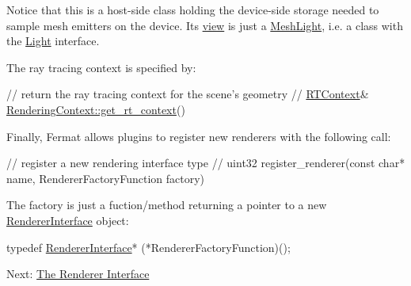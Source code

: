 \begin{DoxyParagraph}{}
Notice that this is a host-\/side class holding the device-\/side storage needed to sample mesh emitters on the device. Its \hyperlink{_fermat_host_device_page_FermatPlainViewsSection}{view} is just a \hyperlink{struct_mesh_light}{Mesh\+Light}, i.\+e. a class with the \hyperlink{struct_light}{Light} interface.
\end{DoxyParagraph}
\begin{DoxyParagraph}{}
The ray tracing context is specified by\+: ~\newline

\begin{DoxyCode}
\textcolor{comment}{// return the ray tracing context for the scene's geometry}
\textcolor{comment}{//}
\hyperlink{struct_r_t_context}{RTContext}& \hyperlink{struct_rendering_context_af12ae90cc453d139f6f8ae35791e6563}{RenderingContext::get\_rt\_context}()
\end{DoxyCode}

\end{DoxyParagraph}
\begin{DoxyParagraph}{}
Finally, Fermat allows plugins to register new renderers with the following call\+: ~\newline

\begin{DoxyCode}
\textcolor{comment}{// register a new rendering interface type}
\textcolor{comment}{//}
uint32 register\_renderer(\textcolor{keyword}{const} \textcolor{keywordtype}{char}* name, RendererFactoryFunction factory)
\end{DoxyCode}
 The factory is just a fuction/method returning a pointer to a new \hyperlink{struct_renderer_interface}{Renderer\+Interface} object\+: ~\newline

\begin{DoxyCode}
\textcolor{keyword}{typedef} \hyperlink{struct_renderer_interface}{RendererInterface}* (*RendererFactoryFunction)();
\end{DoxyCode}

\end{DoxyParagraph}
Next\+: \hyperlink{_renderer_interface_page}{The Renderer Interface} 